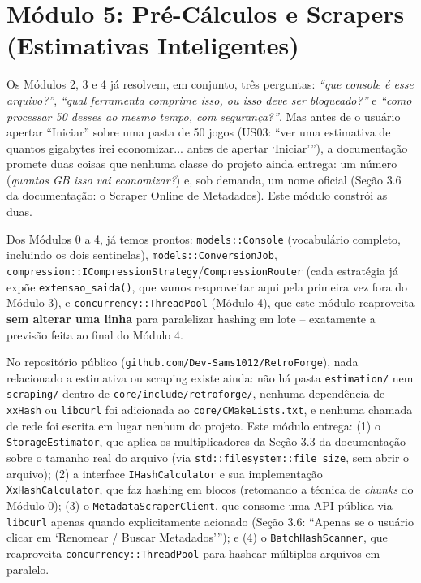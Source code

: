 \section{Módulo 5: Pré-Cálculos e Scrapers (Estimativas Inteligentes)}

Os Módulos 2, 3 e 4 já resolvem, em conjunto, três perguntas: \textit{``que console é esse arquivo?''}, \textit{``qual ferramenta comprime isso, ou isso deve ser bloqueado?''} e \textit{``como processar 50 desses ao mesmo tempo, com segurança?''}. Mas antes de o usuário apertar ``Iniciar'' sobre uma pasta de 50 jogos (US03: ``ver uma estimativa de quantos gigabytes irei economizar... antes de apertar `Iniciar'''), a documentação promete duas coisas que nenhuma classe do projeto ainda entrega: um número (\textit{quantos GB isso vai economizar?}) e, sob demanda, um nome oficial (Seção 3.6 da documentação: o Scraper Online de Metadados). Este módulo constrói as duas.

\begin{CaixaInfo}[title={O que já existe vs. o que este módulo constrói}]
Dos Módulos 0 a 4, já temos prontos: \texttt{models::Console} (vocabulário completo, incluindo os dois sentinelas), \texttt{models::ConversionJob}, \texttt{compression::ICompressionStrategy}/\texttt{CompressionRouter} (cada estratégia já expõe \texttt{extensao\_saida()}, que vamos reaproveitar aqui pela primeira vez fora do Módulo 3), e \texttt{concurrency::ThreadPool} (Módulo 4), que este módulo reaproveita \textbf{sem alterar uma linha} para paralelizar hashing em lote -- exatamente a previsão feita ao final do Módulo 4.

No repositório público (\texttt{github.com/Dev-Sams1012/RetroForge}), nada relacionado a estimativa ou scraping existe ainda: não há pasta \texttt{estimation/} nem \texttt{scraping/} dentro de \texttt{core/include/retroforge/}, nenhuma dependência de \texttt{xxHash} ou \texttt{libcurl} foi adicionada ao \texttt{core/CMakeLists.txt}, e nenhuma chamada de rede foi escrita em lugar nenhum do projeto. Este módulo entrega: (1) o \texttt{StorageEstimator}, que aplica os multiplicadores da Seção 3.3 da documentação sobre o tamanho real do arquivo (via \texttt{std::filesystem::file\_size}, sem abrir o arquivo); (2) a interface \texttt{IHashCalculator} e sua implementação \texttt{XxHashCalculator}, que faz hashing em blocos (retomando a técnica de \textit{chunks} do Módulo 0); (3) o \texttt{MetadataScraperClient}, que consome uma API pública via \texttt{libcurl} apenas quando explicitamente acionado (Seção 3.6: ``Apenas se o usuário clicar em `Renomear / Buscar Metadados'''); e (4) o \texttt{BatchHashScanner}, que reaproveita \texttt{concurrency::ThreadPool} para hashear múltiplos arquivos em paralelo.
\end{CaixaInfo}

